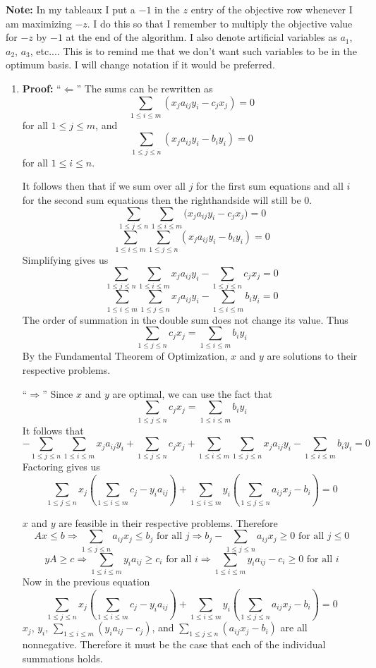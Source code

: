 \documentclass{article}[12pt,a4paper]
\begin{document}
  \textbf{Note:} In my tableaux I put a $-1$ in the $z$ entry of the objective row whenever I am maximizing
  $-z$. I do this so that I remember to multiply the objective value for $-z$ by $-1$ at the end of the algorithm.
  I also denote artificial variables as $a_1$, $a_2$, $a_3$, etc.... This is to remind me that we don't want such
  variables to be in the optimum basis. I will change notation if it would be preferred.
  \pagebreak
  
  \begin{enumerate}
  \item \textbf{Proof:} \newline
  ``$\mathbf{\Leftarrow}$'' \newline
  The sums can be rewritten as
  $$\sum_{1 \le i \le m}{(x_ja_{ij}y_i - c_jx_j)} = 0$$
  for all $1 \le j \le m$, and
  $$\sum_{1 \le j \le n}{(x_ja_{ij}y_i - b_iy_i)} = 0$$ 
  for all $1 \le i \le n$.
  
  It follows then that if we sum over all $j$ for the first sum equations and all $i$ for the second sum equations 
  then the righthandside will still be $0$.
  $$\sum_{1 \le j \le n}{\sum_{1 \le i \le m}{(x_ja_{ij}y_i - c_jx_j})} = 0$$
  $$\sum_{1 \le i \le m}{\sum_{1 \le j \le n}{(x_ja_{ij}y_i - b_iy_i)}} = 0$$ 
  Simplifying gives us
  $$\sum_{1 \le j \le n}{\sum_{1 \le i \le m}{x_ja_{ij}y_i}} - \sum_{1 \le j \le n}{c_jx_j} = 0$$
  $$\sum_{1 \le i \le m}{\sum_{1 \le j \le n}{x_ja_{ij}y_i - \sum_{1 \le i \le m}{b_iy_i}}} = 0$$ 
  The order of summation in the double sum does not change its value. Thus
  $$\sum_{1 \le j \le n}{c_jx_j} = \sum_{1 \le i \le m}{b_iy_i}$$
  By the Fundamental Theorem of Optimization, $x$ and $y$ are solutions to their respective problems. \newline
  
  ``$\mathbf{\Rightarrow}$'' \newline
  Since $x$ and $y$ are optimal, we can use the fact that
  $$\sum_{1 \le j \le n}{c_jx_j} = \sum_{1 \le i \le m}{b_iy_i}$$
  It follows that
  $$ -\sum_{1 \le j \le n}{\sum_{1 \le i \le m}{x_ja_{ij}y_i}} + \sum_{1 \le j \le n}{c_jx_j} +
  \sum_{1 \le i \le m}{\sum_{1 \le j \le n}{x_ja_{ij}y_i - \sum_{1 \le i \le m}{b_iy_i}}} = 0$$
  Factoring gives us
  $$\sum_{1 \le j \le n}{x_j(\sum_{1 \le i \le m}{c_j - y_ia_{ij}})} + 
      \sum_{1 \le i \le m}{y_i(\sum_{1 \le j \le n}{a_{ij}x_j - b_i})} = 0$$
  \pagebreak
  
  $x$ and $y$ are feasible in their respective problems. Therefore
  $$Ax \le b \Rightarrow \sum_{1 \le j \le n}{a_{ij}x_j} \le b_j \mbox{ for all } j \Rightarrow
   b_j - \sum_{1 \le j \le n}{a_{ij}x_j} \ge 0 \mbox{ for all } j \le 0$$ 
  $$yA \ge c \Rightarrow \sum_{1 \le i \le m}{y_ia_{ij}} \ge c_i \mbox{ for all } i \Rightarrow
   \sum_{1 \le i \le m}{y_ia_{ij}} - c_i \ge 0 \mbox{ for all } i$$   
  Now in the previous equation
  $$\sum_{1 \le j \le n}{x_j(\sum_{1 \le i \le m}{c_j - y_ia_{ij}})} + 
      \sum_{1 \le i \le m}{y_i(\sum_{1 \le j \le n}{a_{ij}x_j - b_i})} = 0$$
  $x_j$, $y_i$, $\sum_{1 \le i \le m}{(y_ia_{ij} - c_j)}$, and $\sum_{1 \le j \le n}{(a_{ij}x_j - b_i)}$ are all 
  nonnegative. Therefore it must be the case that each of the individual summations holds.
  

\end{enumerate}
\end{document}
